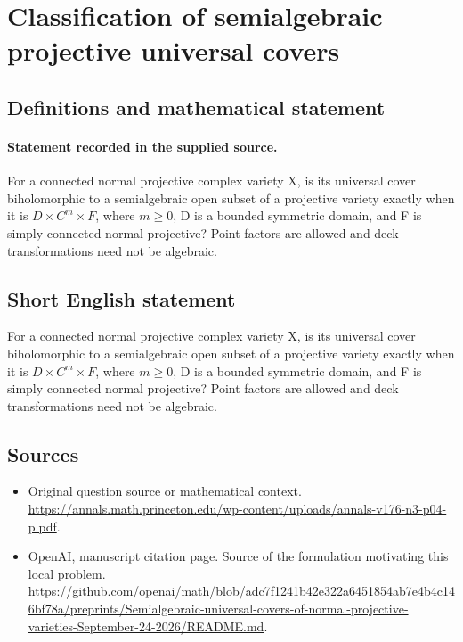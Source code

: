 \documentclass[11pt]{article}
\begin{document}
\section*{Classification of semialgebraic projective universal covers}\label{statement}
\subsection{Definitions and mathematical statement}
\paragraph{Statement recorded in the supplied source.}
For a connected normal projective complex variety X, is its universal cover biholomorphic to a semialgebraic open subset of a projective variety exactly when it is $D×C^m×F$, where $m\geq 0$, D is a bounded symmetric domain, and F is simply connected normal projective? Point factors are allowed and deck transformations need not be algebraic.
\subsection{Short English statement}
For a connected normal projective complex variety X, is its universal cover biholomorphic to a semialgebraic open subset of a projective variety exactly when it is $D×C^m×F$, where $m\geq 0$, D is a bounded symmetric domain, and F is simply connected normal projective? Point factors are allowed and deck transformations need not be algebraic.
\subsection{Sources}
\begin{itemize}
\item[S1] Original question source or mathematical context.
\url{https://annals.math.princeton.edu/wp-content/uploads/annals-v176-n3-p04-p.pdf}.
\item[S2] OpenAI, manuscript citation page. Source of the formulation motivating this local problem.
\url{https://github.com/openai/math/blob/adc7f1241b42e322a6451854ab7e4b4c146bf78a/preprints/Semialgebraic-universal-covers-of-normal-projective-varieties-September-24-2026/README.md}.
\end{itemize}
\end{document}
